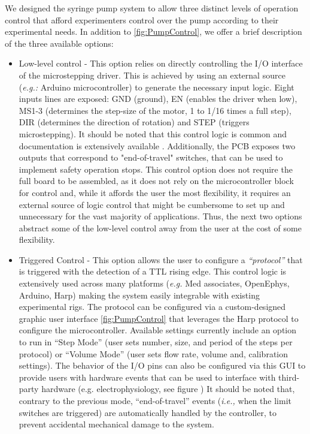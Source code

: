We designed the syringe pump system to allow three distinct levels of operation control that afford experimenters control over the pump according to their experimental needs. In addition to \ref*{fig:PumpControl}, we offer a brief description of the three available options:
\begin{itemize}

\item{Low-level control} - This option relies on directly controlling the I/O interface of the microstepping driver. This is achieved by using an external source (\textit{e.g.:} Arduino microcontroller) to generate the necessary input logic. Eight inputs lines are exposed: GND (ground), EN (enables the driver when low), MS1-3 (determines the step-size of the motor, 1 to 1/16 times a full step), DIR (determines the direction of rotation) and STEP (triggers microstepping). It should be noted that this control logic is common and documentation is extensively available .
Additionally, the PCB exposes two outputs that correspond to "end-of-travel" switches, that can be used to implement safety operation stops.
This control option does not require the full board to be assembled, as it does not rely on the microcontroller block for control and, while it affords the user the most flexibility, it requires an external source of logic control that might be cumbersome to set up and unnecessary for the vast majority of applications. Thus, the next two options abstract some of the low-level control away from the user at the cost of some flexibility.

\item{Triggered Control} - This option allows the user to configure a \textit{“protocol”} that is triggered with the detection of a TTL rising edge. This control logic is extensively used across many platforms (\textit{e.g.} Med associates, OpenEphys, Arduino, Harp) making the system easily integrable with existing experimental rigs.
The protocol can be configured via a custom-designed graphic user interface \ref{fig:PumpControl} that leverages the Harp protocol to configure the microcontroller. Available settings currently include an option to run in “Step Mode” (user sets number, size, and period of the steps per protocol) or “Volume Mode” (user sets flow rate, volume and, calibration settings). The behavior of the I/O pins can also be configured via this GUI to provide users with hardware events that can be used to interface with third-party hardware (e.g. electrophysiology, see figure )
It should be noted that, contrary to the previous mode, “end-of-travel” events (\textit{i.e.,} when the limit switches are triggered) are automatically handled by the controller, to prevent accidental mechanical damage to the system.


\end{itemize}
